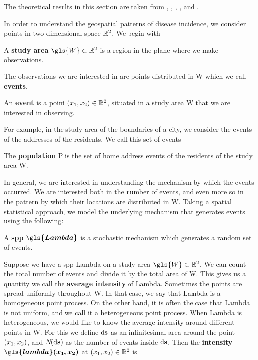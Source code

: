 The theoretical results in this section are taken from \citet{diggle1983spatial},
\citet{diggle1988equivalence},
\citet{guan2008consistent},
\citet{silverman1986density},
and \citet{wand1994kernel}.

In order to understand the geospatial patterns of disease incidence,
we consider points in two-dimensional space $\mathbb{R}^2$.
We begin with

\begin{defn}
    \label{defn:studyarea}
    A \textbf{study area} $\gls{W} \subset \RS$ is a region in the plane where we make observations.
\end{defn}

The observations we are interested in are points distributed in \gls{W} which we call \textbf{events}.

\begin{defn}
    \label{defn:event}
    An \textbf{event} is a point $(x_1, x_2) \in \mathbb{R}^2$, situated in a study area \gls{W} that we are interested in observing.
\end{defn}

For example, in the study area of the boundaries of a city, we consider the events of the addresses of the residents.
We call this set of events

\begin{defn}
    The \textbf{population} \gls{P} is the set of home address events of the residents of the study area \gls{W}.
\end{defn}

In general, we are interested in understanding the mechanism by which the events occurred.
We are interested both in the number of events, and even more so in the pattern by which their locations are distributed in \gls{W}.
Taking a spatial statistical approach, we model the underlying mechanism that generates events using the following:

\begin{defn}
    \label{defn:spp}
    A \textbf{\gls{spp}} $\boldsymbol{\gls{Lambda}}$ is a stochastic mechanism which generates a random set of events.
\end{defn}

Suppose we have a \gls{spp} \gls{Lambda} on a study area $\gls{W} \subset \RS$.
We can count the total number of \glspl{event} and divide it by the total area of \gls{W}.
This gives us a quantity we call the \textbf{average \gls{intensity}} of \gls{Lambda}.
Sometimes the points are spread uniformly throughout \gls{W}.
In that case, we say that \gls{Lambda} is a homogeneous point process.
On the other hand, it is often the case that \gls{Lambda} is not uniform,
and we call it a heterogeneous point process.
When \gls{Lambda} is heterogeneous,
we would like to know the average \gls{intensity} around different points in \gls{W}.
For this
we define $\mathop{}\!\mathrm{d}{\mathbf{s}}$ as an infinitesimal area around the point $(x_1, x_2)$,
and $N\!(\mathop{}\!\mathrm{d}{\mathbf{s}})$ as the number of \glspl{event} inside $\mathop{}\!\mathrm{d}{\mathbf{s}}$.
Then the \textbf{\gls{intensity}} $\boldsymbol{\gls{lambda}\xvec}$ at $(x_1, x_2) \in \mathbb{R}^2$ is

